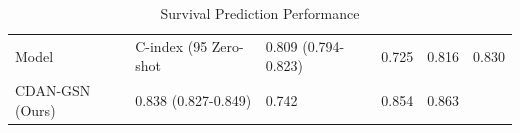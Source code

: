 \begin{table}
\caption{Survival Prediction Performance}
\label{tab:performance}
\begin{tabular}{lllll}
\toprule
Model & C-index (95%
\midrule
Zero-shot & 0.809 (0.794-0.823) & 0.725 & 0.816 & 0.830 \\
CDAN-GSN (Ours) & 0.838 (0.827-0.849) & 0.742 & 0.854 & 0.863 \\
\bottomrule
\end{tabular}
\end{table}
